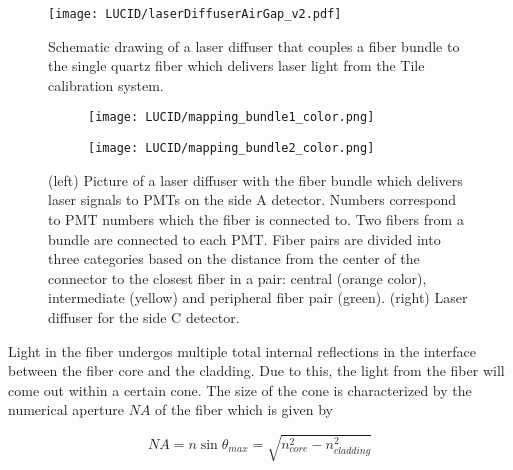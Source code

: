 \begin{figure}
\centering
\texttt{[image: LUCID/laserDiffuserAirGap\_v2.pdf]}
\caption{Schematic drawing of a laser diffuser that couples a fiber bundle to the single quartz fiber which delivers laser light from the Tile calibration system.}
\label{fig:laserDiffuserSchematics}
\end{figure}

\begin{figure}
\centering
\begin{subfigure}{.45\textwidth}
  \centering
  \texttt{[image: LUCID/mapping\_bundle1\_color.png]}
\end{subfigure}%
\begin{subfigure}{.45\textwidth}
  \centering
  \texttt{[image: LUCID/mapping\_bundle2\_color.png]}
\end{subfigure}
\caption{(left) Picture of a laser diffuser with the fiber bundle which delivers laser signals to PMTs on the side A detector. 
Numbers correspond to PMT numbers which the fiber is connected to. 
Two fibers from a bundle are connected to each PMT. 
Fiber pairs are divided into three categories based on the distance from the center of the connector to the closest fiber 
in a pair: central (orange color), intermediate (yellow) and peripheral fiber pair (green).
(right) Laser diffuser for the side C detector.}
\label{fig:laserDiffuserMapping}
\end{figure}

Light in the fiber undergos multiple total internal reflections in the interface between the fiber core and the cladding. 
Due to this, the light from the fiber will come out within a certain cone. 
The size of the cone is characterized by the numerical aperture $NA$ of the fiber which is given by

\begin{equation}
\label{eq:numericalApperture}
 NA = n \sin{\theta_{max}} = \sqrt{n_{core}^2 - n_{cladding}^2}
\end{equation}

